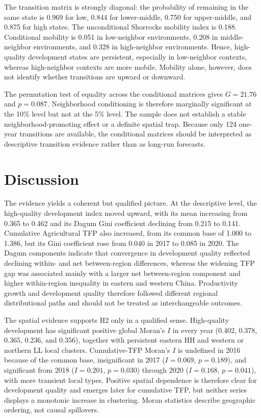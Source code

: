 \documentclass[sustainability,article,submit,moreauthors]{Definitions/mdpi}
\numberwithin{equation}{section}
\begin{document}
The transition matrix is strongly diagonal: the probability of remaining in
the same state is 0.969 for low, 0.844 for lower-middle, 0.750 for
upper-middle, and 0.875 for high states. The unconditional Shorrocks mobility
index is 0.188. Conditional mobility is 0.051 in low-neighbor environments,
0.208 in middle-neighbor environments, and 0.328 in high-neighbor
environments. Hence, high-quality development states are persistent,
especially in low-neighbor contexts, whereas high-neighbor contexts are more
mobile. Mobility alone, however, does not identify whether transitions are
upward or downward.

The permutation test of equality across the conditional matrices gives
$G=21.76$ and $p=0.087$. Neighborhood conditioning is therefore marginally
significant at the 10\% level but not at the 5\% level. The sample does not
establish a stable neighborhood-promoting effect or a definite spatial trap.
Because only 124 one-year transitions are available, the conditional matrices
should be interpreted as descriptive transition evidence rather than as
long-run forecasts.

\section{Discussion}

The evidence yields a coherent but qualified picture. At the descriptive level, the
high-quality development index moved upward, with its mean increasing from
0.365 to 0.462 and its Dagum Gini coefficient declining from 0.215 to 0.141.
Cumulative Agricultural TFP also increased, from its common base of 1.000 to
1.386, but its Gini coefficient rose from 0.040 in 2017 to 0.085 in 2020.
The Dagum components indicate that convergence in development quality reflected
declining within- and net between-region differences, whereas the widening TFP
gap was associated mainly with a larger net between-region component and higher
within-region inequality in eastern and western China. Productivity growth and
development quality therefore followed different regional distributional paths
and should not be treated as interchangeable outcomes.

The spatial evidence supports H2 only in a qualified sense. High-quality
development has significant positive global Moran's $I$ in every year (0.402,
0.378, 0.365, 0.236, and 0.356), together with persistent eastern HH and
western or northern LL local clusters. Cumulative-TFP Moran's $I$ is undefined
in 2016 because of the common base, insignificant in 2017 ($I=0.069$,
$p=0.189$), and significant from 2018 ($I=0.201$, $p=0.030$) through 2020
($I=0.168$, $p=0.041$), with more transient local types. Positive spatial
dependence is therefore clear for development quality and emerges later for
cumulative TFP, but neither series displays a monotonic increase in clustering.
Moran statistics describe geographic ordering, not causal spillovers.
\end{document}
